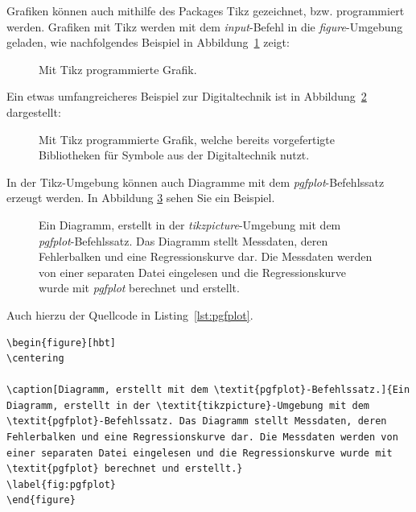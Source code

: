 Grafiken können auch mithilfe des Packages Tikz gezeichnet, bzw. programmiert werden. Grafiken mit Tikz werden mit dem \textit{input}-Befehl in die \textit{figure}-Umgebung geladen, wie nachfolgendes Beispiel in Abbildung~\ref{fig:tikz_house} zeigt:

\begin{figure}[hbt]
	\centering
	
	\caption[Mit Tikz programmierte Grafik.]{Mit Tikz programmierte Grafik.}
	\label{fig:tikz_house}
\end{figure}

Ein etwas umfangreicheres Beispiel zur Digitaltechnik ist in Abbildung~\ref{fig:tikz_digital} dargestellt:

\begin{figure}[hbt]
	\centering
	
	\caption[Mit Tikz programmierte Grafik, welche bereits vorgefertigte Bibliotheken für Symbole aus der Digitaltechnik nutzt.]{Mit Tikz programmierte Grafik, welche bereits vorgefertigte Bibliotheken für Symbole aus der Digitaltechnik nutzt.}
	\label{fig:tikz_digital}
\end{figure}

\clearpage

In der Tikz-Umgebung können auch Diagramme mit dem \textit{pgfplot}-Befehlssatz erzeugt werden. In Abbildung \ref{fig:pgfplot} sehen Sie ein Beispiel.

\begin{figure}[hbt]
	\centering
	
	\caption[Diagramm, erstellt mit dem \textit{pgfplot}-Befehlssatz.]{Ein Diagramm, erstellt in der \textit{tikzpicture}-Umgebung mit dem \textit{pgfplot}-Befehlssatz. Das Diagramm stellt Messdaten, deren Fehlerbalken und eine Regressionskurve dar. Die Messdaten werden von einer separaten Datei eingelesen und die Regressionskurve wurde mit \textit{pgfplot} berechnet und erstellt.}
	\label{fig:pgfplot}
\end{figure}

\clearpage

Auch hierzu der Quellcode in Listing~\ref{lst:pgfplot}.

\begin{lstlisting}[caption=Quellcode der Abbildung~\ref{fig:pgfplot}.,label=lst:pgfplot]
\begin{figure}[hbt]
\centering

\caption[Diagramm, erstellt mit dem \textit{pgfplot}-Befehlssatz.]{Ein Diagramm, erstellt in der \textit{tikzpicture}-Umgebung mit dem \textit{pgfplot}-Befehlssatz. Das Diagramm stellt Messdaten, deren Fehlerbalken und eine Regressionskurve dar. Die Messdaten werden von einer separaten Datei eingelesen und die Regressionskurve wurde mit \textit{pgfplot} berechnet und erstellt.}
\label{fig:pgfplot}
\end{figure}
\end{lstlisting}

